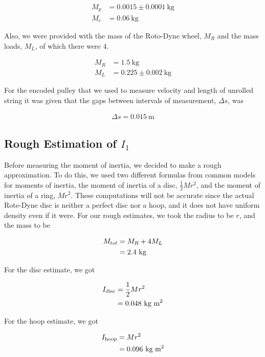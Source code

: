 \documentclass[coverpage]{article}
\newcommand{\iUnit}{\text{kg $\text{m}^2$}}
\newcommand{\rwheel}{Roto-Dyne wheel}
\begin{document}
	\begin{align}
		M_p&=0.0015 \pm 0.0001\ \text{kg} \label{eq:def-mp} \\
		M_c&=0.06\ \text{kg} \label{eq:def-mc}
	\end{align}

	Also, we were provided with the mass of the \rwheel, $M_R$ and the mass loads, $M_L$, of which there were 4.
	
	\begin{align}
		M_R &= 1.5\ \text{kg} \label{eq:def-mr} \\
		M_L &= 0.225 \pm 0.002\ \text{kg} \label{eq:def-ml}
	\end{align}
	
	For the encoded pulley that we used to measure velocity and length of unrolled string it was given that the gaps between intervals of measurement, $\Delta{s}$, was
	
	\begin{align}
		\Delta{s}=0.015\ \text{m}
	\end{align}

	\subsection{Rough Estimation of $I_1$} \label{sect:estimating-moment-of-inertia}

	Before measuring the moment of inertia, we decided to make a rough approximation. To do this, we used two different formulas from common models for moments of inertia, the moment of inertia of a disc, $\frac{1}{2}Mr^2$, and the moment of inertia of a ring, $Mr^2$. These computations will not be accurate since the actual Rote-Dyne disc is neither a perfect disc nor a hoop, and it does not have uniform density even if it were. For our rough estimates, we took the radius to be $r$, and the mass to be
	
	\begin{align}
		M_{tot}&=M_R + 4 M_L \notag \\
		&= 2.4\ \text{kg}
	\end{align}
	
	For the disc estimate, we got
	
	\begin{align}
		I_{\text{disc}}&=\frac{1}{2}Mr^2 \notag \\
		&= 0.048\ \iUnit
	\end{align}
	
	For the hoop estimate, we got
	
	\begin{align}
		I_{\text{hoop}}&= Mr^2 \notag \\
		&= 0.096\ \iUnit
	\end{align}
\end{document}
